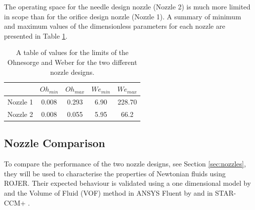 \documentclass[11pt]{article}
\begin{document}
The operating space for the needle design nozzle (Nozzle 2) is much more 
limited in scope than for the orifice design nozzle (Nozzle 1). A summary of 
minimum and maximum values of the dimensionless parameters for each nozzle are 
presented in Table \ref{tbl:operability}. 
\begin{table}[h]
\centering
\begin{tabular}{c|c|c|c|c|}
\cline{2-5}
                               & $Oh_{min}$ & $Oh_{max}$ & $We_{min}$ & 
$We_{max}$ \\ \hline
\multicolumn{1}{|c|}{Nozzle 1} & 0.008      & 0.293      & 6.90       & 228.70 
    \\ \hline
\multicolumn{1}{|c|}{Nozzle 2} & 0.008      & 0.055      & 5.95       & 66.2    
   \\ \hline
\end{tabular}
\caption{A table of values for the limits of the Ohnesorge and Weber for the 
two different nozzle designs.}
\label{tbl:operability}
\end{table}

\subsection{Nozzle Comparison}
To compare the performance of the two nozzle designs, see Section 
\ref{sec:nozzles}, they will be used to characterise the properties of 
Newtonian fluids using ROJER. Their expected behaviour is validated using a one 
dimensional model by \cite{hall2015report} and the Volume of Fluid (VOF) method 
in ANSYS Fluent by \cite{greiciunas2015report} and in STAR-CCM+ 
\citep{gorbatenko2015report}.
\end{document}
